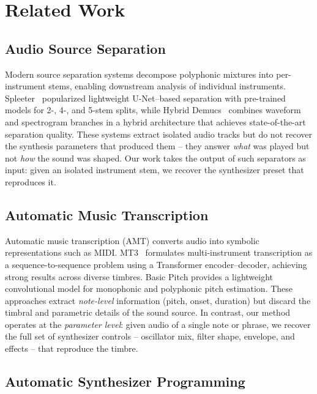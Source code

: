 \section{Related Work}

\subsection{Audio Source Separation}

Modern source separation systems decompose polyphonic mixtures into per-instrument stems, enabling downstream analysis of individual instruments.
Spleeter~\cite{hennequin2020spleeter} popularized lightweight U-Net--based separation with pre-trained models for 2-, 4-, and 5-stem splits, while Hybrid Demucs~\cite{defossez2021hybrid} combines waveform and spectrogram branches in a hybrid architecture that achieves state-of-the-art separation quality.
These systems extract isolated audio tracks but do not recover the synthesis parameters that produced them -- they answer \emph{what} was played but not \emph{how} the sound was shaped.
Our work takes the output of such separators as input: given an isolated instrument stem, we recover the synthesizer preset that reproduces it.

\subsection{Automatic Music Transcription}

Automatic music transcription (AMT) converts audio into symbolic representations such as MIDI.
MT3~\cite{gardner2022mt3} formulates multi-instrument transcription as a sequence-to-sequence problem using a Transformer encoder--decoder, achieving strong results across diverse timbres.
Basic Pitch provides a lightweight convolutional model for monophonic and polyphonic pitch estimation.
These approaches extract \emph{note-level} information (pitch, onset, duration) but discard the timbral and parametric details of the sound source.
In contrast, our method operates at the \emph{parameter level}: given audio of a single note or phrase, we recover the full set of synthesizer controls -- oscillator mix, filter shape, envelope, and effects -- that reproduce the timbre.

\subsection{Automatic Synthesizer Programming}

